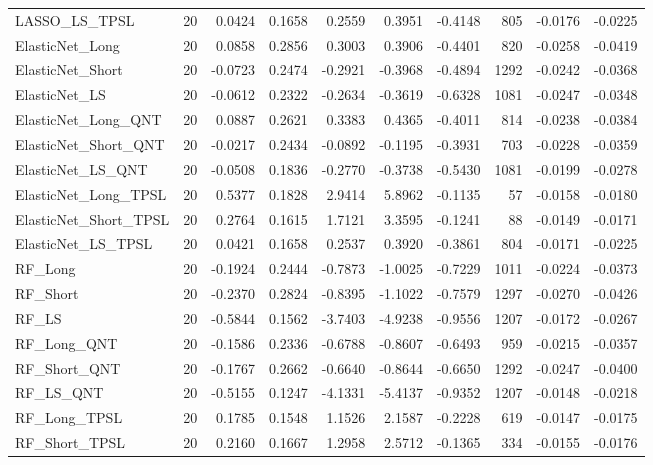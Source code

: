\begin{tabular}{llrrrrrrrr}
\cline{1-10}
LASSO\_LS\_TPSL & 20 & 0.0424 & 0.1658 & 0.2559 & 0.3951 & -0.4148 & 805 & -0.0176 & -0.0225 \\
\cline{1-10}
ElasticNet\_Long & 20 & 0.0858 & 0.2856 & 0.3003 & 0.3906 & -0.4401 & 820 & -0.0258 & -0.0419 \\
\cline{1-10}
ElasticNet\_Short & 20 & -0.0723 & 0.2474 & -0.2921 & -0.3968 & -0.4894 & 1292 & -0.0242 & -0.0368 \\
\cline{1-10}
ElasticNet\_LS & 20 & -0.0612 & 0.2322 & -0.2634 & -0.3619 & -0.6328 & 1081 & -0.0247 & -0.0348 \\
\cline{1-10}
ElasticNet\_Long\_QNT & 20 & 0.0887 & 0.2621 & 0.3383 & 0.4365 & -0.4011 & 814 & -0.0238 & -0.0384 \\
\cline{1-10}
ElasticNet\_Short\_QNT & 20 & -0.0217 & 0.2434 & -0.0892 & -0.1195 & -0.3931 & 703 & -0.0228 & -0.0359 \\
\cline{1-10}
ElasticNet\_LS\_QNT & 20 & -0.0508 & 0.1836 & -0.2770 & -0.3738 & -0.5430 & 1081 & -0.0199 & -0.0278 \\
\cline{1-10}
ElasticNet\_Long\_TPSL & 20 & 0.5377 & 0.1828 & 2.9414 & 5.8962 & -0.1135 & 57 & -0.0158 & -0.0180 \\
\cline{1-10}
ElasticNet\_Short\_TPSL & 20 & 0.2764 & 0.1615 & 1.7121 & 3.3595 & -0.1241 & 88 & -0.0149 & -0.0171 \\
\cline{1-10}
ElasticNet\_LS\_TPSL & 20 & 0.0421 & 0.1658 & 0.2537 & 0.3920 & -0.3861 & 804 & -0.0171 & -0.0225 \\
\cline{1-10}
RF\_Long & 20 & -0.1924 & 0.2444 & -0.7873 & -1.0025 & -0.7229 & 1011 & -0.0224 & -0.0373 \\
\cline{1-10}
RF\_Short & 20 & -0.2370 & 0.2824 & -0.8395 & -1.1022 & -0.7579 & 1297 & -0.0270 & -0.0426 \\
\cline{1-10}
RF\_LS & 20 & -0.5844 & 0.1562 & -3.7403 & -4.9238 & -0.9556 & 1207 & -0.0172 & -0.0267 \\
\cline{1-10}
RF\_Long\_QNT & 20 & -0.1586 & 0.2336 & -0.6788 & -0.8607 & -0.6493 & 959 & -0.0215 & -0.0357 \\
\cline{1-10}
RF\_Short\_QNT & 20 & -0.1767 & 0.2662 & -0.6640 & -0.8644 & -0.6650 & 1292 & -0.0247 & -0.0400 \\
\cline{1-10}
RF\_LS\_QNT & 20 & -0.5155 & 0.1247 & -4.1331 & -5.4137 & -0.9352 & 1207 & -0.0148 & -0.0218 \\
\cline{1-10}
RF\_Long\_TPSL & 20 & 0.1785 & 0.1548 & 1.1526 & 2.1587 & -0.2228 & 619 & -0.0147 & -0.0175 \\
\cline{1-10}
RF\_Short\_TPSL & 20 & 0.2160 & 0.1667 & 1.2958 & 2.5712 & -0.1365 & 334 & -0.0155 & -0.0176 \\

\end{tabular}
